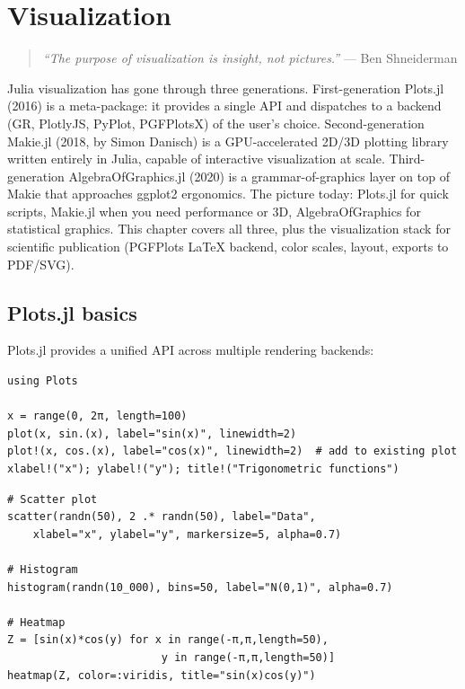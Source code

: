 \chapter{Visualization}
\label{ch:visualization}

\begin{quote}
\emph{``The purpose of visualization is insight, not pictures.''}
--- Ben Shneiderman
\end{quote}

Julia visualization has gone through three generations. First-generation Plots.jl (2016) is a meta-package: it provides a single API and dispatches to a backend (GR, PlotlyJS, PyPlot, PGFPlotsX) of the user's choice. Second-generation Makie.jl (2018, by Simon Danisch) is a GPU-accelerated 2D/3D plotting library written entirely in Julia, capable of interactive visualization at scale. Third-generation AlgebraOfGraphics.jl (2020) is a grammar-of-graphics layer on top of Makie that approaches ggplot2 ergonomics. The picture today: Plots.jl for quick scripts, Makie.jl when you need performance or 3D, AlgebraOfGraphics for statistical graphics. This chapter covers all three, plus the visualization stack for scientific publication (PGFPlots LaTeX backend, color scales, layout, exports to PDF/SVG).

\section{Plots.jl basics}

Plots.jl provides a unified API across multiple rendering backends:

\begin{verbatim}
using Plots

x = range(0, 2π, length=100)
plot(x, sin.(x), label="sin(x)", linewidth=2)
plot!(x, cos.(x), label="cos(x)", linewidth=2)  # add to existing plot
xlabel!("x"); ylabel!("y"); title!("Trigonometric functions")
\end{verbatim}

\begin{verbatim}
# Scatter plot
scatter(randn(50), 2 .* randn(50), label="Data",
    xlabel="x", ylabel="y", markersize=5, alpha=0.7)

# Histogram
histogram(randn(10_000), bins=50, label="N(0,1)", alpha=0.7)

# Heatmap
Z = [sin(x)*cos(y) for x in range(-π,π,length=50),
                        y in range(-π,π,length=50)]
heatmap(Z, color=:viridis, title="sin(x)cos(y)")
\end{verbatim}

